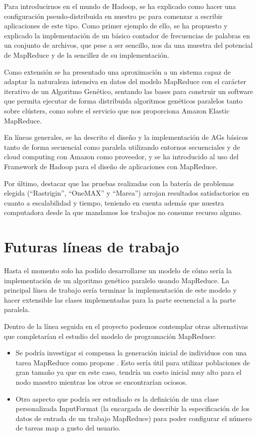 \documentclass[runningheads]{llncs}
\begin{document}
Para introducirnos en el mundo de Hadoop, se ha explicado como hacer una configuración pseudo-distribuida en nuestro pc para 
comenzar a escribir aplicaciones de este tipo. Como primer ejemplo de ello, se ha propuesto y explicado la 
implementación de un básico contador de frecuencias de palabras en un conjunto de archivos, 
que pese a ser sencillo, nos da una muestra del potencial de MapReduce y de la sencillez de su implementación.  


Como extensión se ha presentado una aproximación a un sistema capaz de adaptar la naturaleza intensiva en datos del modelo MapReduce con el carácter 
iterativo de un Algoritmo Genético, sentando las bases para construir un software que permita ejecutar de forma distribuida 
algoritmos genéticos paralelos tanto sobre clústers, como sobre el servicio que nos proporciona Amazon Elastic MapReduce.  


En líneas generales, se ha descrito el diseño y la implementación de AGs básicos tanto de forma secuencial  como paralela utilizando 
entornos secuenciales y de cloud computing con Amazon como proveedor, y se ha introducido al uso del Framework de Hadoop para el 
diseño de aplicaciones con MapReduce.


Por último, destacar que las pruebas realizadas con la batería de problemas elegida (``Rastrigin'', ``OneMAX'' y ``Marea'') arrojan 
resultados satisfactorios en cuanto a escalabilidad y tiempo, teniendo en cuenta además que nuestra computadora desde la que 
mandamos los trabajos no consume recurso alguno. 


\section*{Futuras líneas de trabajo}


Hasta el momento solo ha podido desarrollarse un modelo de cómo sería la implementación de un algoritmo genético paralelo 
usando MapReduce.  La principal línea de trabajo sería terminar la implementación de este modelo y hacer extensible 
las clases implementadas para la parte secuencial a la parte paralela.

Dentro de la línea seguida en el proyecto podemos contemplar otras alternativas que completarían el estudio del modelo de 
programación MapReduce:

\begin{itemize}
 \item Se podría investigar si compensa la generación inicial de individuos con una tarea MapReduce como propone \cite{Gen09}. 
Esto sería útil para utilizar poblaciones de gran tamaño ya que en este caso, tendría un costo inicial muy alto para el 
nodo maestro mientras los otros se encontrarían ociosos.
 \item Otro aspecto que podría ser estudiado es la definición de una clase personalizada InputFormat (la encargada de describir la 
especificación de los datos de entrada de un trabajo MapReduce) para poder configurar el número de tareas map a gusto del usuario.
\end{itemize}
\end{document}
